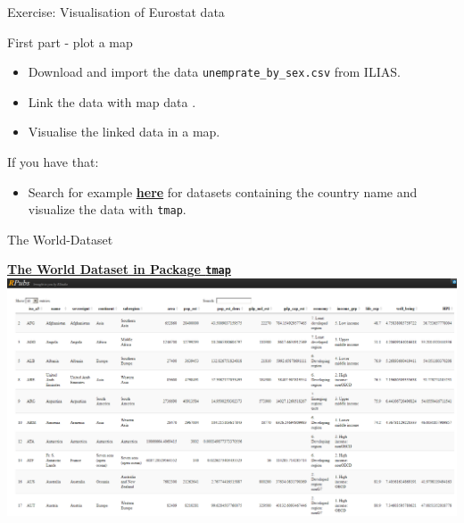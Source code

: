 \documentclass[
  ignorenonframetext,
]{beamer}
\providecommand{\tightlist}{%
  \setlength{\itemsep}{0pt}\setlength{\parskip}{0pt}}
\begin{document}
\begin{frame}[fragile]{Exercise: Visualisation of Eurostat data}
\protect\hypertarget{exercise-visualisation-of-eurostat-data}{}
\begin{block}{First part - plot a map}
\protect\hypertarget{first-part---plot-a-map}{}
\begin{itemize}
\tightlist
\item
  Download and import the data \texttt{unemprate\_by\_sex.csv} from
  ILIAS.
\item
  Link the data with map data .
\item
  Visualise the linked data in a map.
\end{itemize}
\end{block}

\begin{block}{If you have that:}
\protect\hypertarget{if-you-have-that}{}
\begin{itemize}
\tightlist
\item
  Search for example
  \href{https://ec.europa.eu/eurostat/web/euro-indicators}{\textbf{here}}
  for datasets containing the country name and visualize the data with
  \texttt{tmap}.
\end{itemize}
\end{block}
\end{frame}

\begin{frame}[fragile]{The World-Dataset}
\protect\hypertarget{the-world-dataset-1}{}
\begin{block}{\href{http://rpubs.com/Japhilko82/tmap_europe_dataset}{\textbf{The
World Dataset in Package \texttt{tmap}}}}
\protect\hypertarget{the-world-dataset-in-package-tmap}{}
\includegraphics{pics/tmap_world.PNG}
\end{block}
\end{frame}
\end{document}
